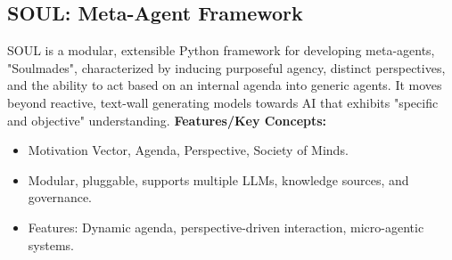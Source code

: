 \documentclass[12pt]{article}
\newcommand{\placeholder}[1]{
  \begin{tikzpicture}
    \node[draw=gray, dashed, text width=0.9\linewidth, align=center, minimum height=2cm] 
    {\footnotesize\textcolor{gray}{Placeholder for: #1}};
  \end{tikzpicture}
}
\begin{document}
\begin{multicols}{2}
\subsection{SOUL: Meta-Agent Framework}
SOUL is a modular, extensible Python framework for developing meta-agents, "Soulmades", characterized by inducing purposeful agency, distinct perspectives, and the ability to act based on an internal agenda into generic agents. It moves beyond reactive, text-wall generating models towards AI that exhibits "specific and objective" understanding.
\vspace{0.5em}
\textbf{Features/Key Concepts:}
\begin{itemize}[leftmargin=*, itemsep=0pt, topsep=2pt]
  \item Motivation Vector, Agenda, Perspective, Society of Minds.
  \item Modular, pluggable, supports multiple LLMs, knowledge sources, and governance.
  \item Features: Dynamic agenda, perspective-driven interaction, micro-agentic systems.
\end{itemize}
\vspace{0.5em}
\begin{center}
\end{center}
\vspace{1em}



\end{multicols}
\end{document}
